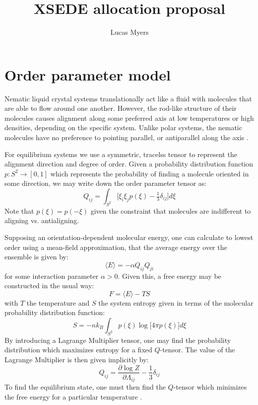 \documentclass[reqno]{article}
\begin{document}
\title{XSEDE allocation proposal}
\author{Lucas Myers}
\maketitle

\section{Order parameter model}
Nematic liquid crystal systems translationally act like a fluid with molecules
that are able to flow around one another.
However, the rod-like structure of their molecules causes alignment along some
preferred axis at low temperatures or high densities, depending on the specific
system.
Unlike polar systems, the nematic molecules have no preference to pointing
parallel, or antiparallel along the axis \cite{selinger_introduction_2016}.

For equilibrium systems we use a symmetric, tracelss tensor to represent the
alignment direction and degree of order.
Given a probability distribution function $p: S^2 \to [0, 1]$ which represents
the probability of finding a molecule oriented in some direction, we may write
down the order parameter tensor as:
\begin{equation}
  Q_{ij}
  =
  \int_{S^2} \bigl[ \xi_i \xi_j p(\xi) - \tfrac13 \delta_{ij} \bigr] d\xi
\end{equation}
Note that $p(\xi) = p(-\xi)$ given the constraint that molecules are indifferent
to aligning vs. antialigning.

Supposing an orientation-dependent molecular energy, one can calculate to lowest
order using a mean-field approximation, that the average energy over the
ensemble is given by:
\begin{equation}
  \langle E \rangle
  =
  -\alpha Q_{ij} Q_{ji}
\end{equation}
for some interaction parameter $\alpha > 0$.
Given this, a free energy may be constructed in the usual way:
\begin{equation}
  F = \langle E \rangle - TS
\end{equation}
with $T$ the temperature and $S$ the system entropy given in terms of the molecular
probability distribution function:
\begin{equation}
  S
  =
  -n k_B
  \int_{S^2}
  p(\xi) \log \bigl[ 4 \pi p(\xi) \bigr] d\xi
\end{equation}
By introducing a Lagrange Multiplier tensor, one may find the probability
distribution which maximizes entropy for a fixed $Q$-tensor.
The value of the Lagrange Multiplier is then given implicitly by:
\begin{equation}
  Q_{ij}
  =
  \frac{\partial \log Z}{\partial \Lambda_{ij}} - \frac13 \delta_{ij}
\end{equation}
To find the equilibrium state, one must then find the $Q$-tensor which
minimizes the free energy for a particular temperature \cite{schimming_computational_2020}.
\end{document}
